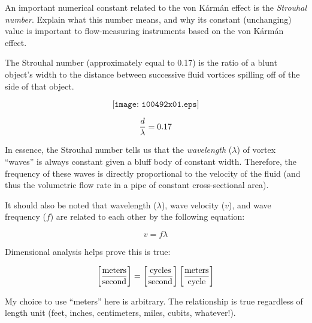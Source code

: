 

An important numerical constant related to the von K\'arm\'an effect is the {\it Strouhal number}.  Explain what this number means, and why its constant (unchanging) value is important to flow-measuring instruments based on the von K\'arm\'an effect.







The Strouhal number (approximately equal to 0.17) is the ratio of a blunt object's width to the distance between successive fluid vortices spilling off of the side of that object.

$$\texttt{[image: i00492x01.eps]}$$

$${d \over \lambda} = 0.17$$

\vskip 10pt

In essence, the Strouhal number tells us that the {\it wavelength} ($\lambda$) of vortex ``waves'' is always constant given a bluff body of constant width.  Therefore, the frequency of these waves is directly proportional to the velocity of the fluid (and thus the volumetric flow rate in a pipe of constant cross-sectional area).

\vskip 10pt

It should also be noted that wavelength ($\lambda$), wave velocity ($v$), and wave frequency ($f$) are related to each other by the following equation:

$$v = f \lambda$$

Dimensional analysis helps prove this is true:

$$\left[\hbox{meters} \over \hbox{second}\right] = \left[\hbox{cycles} \over \hbox{second}\right] \left[\hbox{meters} \over \hbox{cycle}\right]$$

My choice to use ``meters'' here is arbitrary.  The relationship is true regardless of length unit (feet, inches, centimeters, miles, cubits, whatever!).











